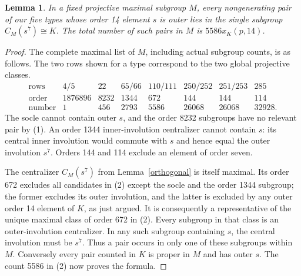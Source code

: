 \documentclass[11pt,a4paper]{article}
\newtheorem{lemma}{Lemma}\newtheorem{theorem}{Theorem}
\begin{document}
\begin{lemma}\label{outer}
In a fixed projective maximal subgroup $M$, every nongenerating
pair of our five types whose order 14 element $s$ is outer lies
in the single subgroup $C_M(s^7)\cong K$. The total number of
such pairs in $M$ is $5586x_K(p,14)$.
\end{lemma}
\begin{proof}
The complete maximal list of $M$, including actual subgroup counts,
is as follows. The two rows shown for a type correspond to the
two global projective classes.
\[
\begin{array}{c|rrrrrrr}
\text{rows}&4/5&22&65/66&110/111&250/252&251/253&285\\
\text{order}&1876896&8232&1344&672&144&144&114\\
\text{number}&1&456&2793&5586&26068&26068&32928.
\end{array}                                                     \tag{2}
\]
The socle cannot contain outer $s$, and the order 8232 subgroups
have no relevant pair by (1). An order 1344 inner-involution
centralizer cannot contain $s$: its central inner involution
would commute with $s$ and hence equal the outer involution $s^7$.
Orders 144 and 114 exclude an element of order seven.

The centralizer $C_M(s^7)$ from Lemma~\ref{orthogonal} is itself
maximal. Its order 672 excludes all candidates in (2) except the
socle and the order 1344 subgroup; the former excludes its outer
involution, and the latter is excluded by any outer order 14
element of $K$, as just argued. It is consequently a representative
of the unique maximal class of order 672 in (2). Every subgroup
in that class is an outer-involution centralizer. In any such
subgroup containing $s$, the central involution must be $s^7$.
Thus a pair occurs in only one of these subgroups within $M$.
Conversely every pair counted in $K$ is proper in $M$ and has
outer $s$. The count 5586 in (2) now proves the formula.
\end{proof}
\end{document}
